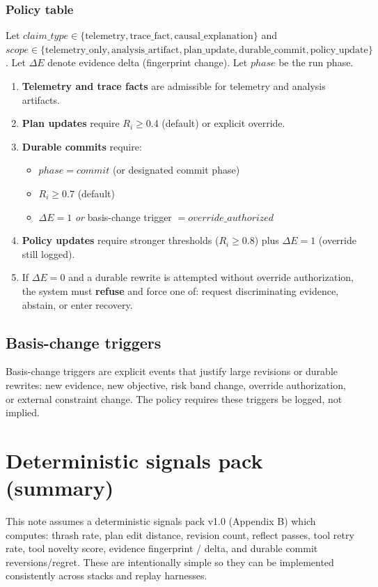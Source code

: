 \documentclass[11pt]{article}
\begin{document}
\subsubsection*{Policy table}
Let $claim\_type \in \{\text{telemetry}, \text{trace\_fact}, \text{causal\_explanation}\}$ and
$scope \in \{\text{telemetry\_only}, \text{analysis\_artifact}, \text{plan\_update}, \text{durable\_commit}, \text{policy\_update}\}$.
Let $\Delta E$ denote evidence delta (fingerprint change). Let $phase$ be the run phase.

\begin{enumerate}[leftmargin=2.0em]
  \item \textbf{Telemetry and trace facts} are admissible for telemetry and analysis artifacts.
  \item \textbf{Plan updates} require $R_i \ge 0.4$ (default) or explicit override.
  \item \textbf{Durable commits} require:
    \begin{itemize}
      \item $phase = commit$ (or designated commit phase)
      \item $R_i \ge 0.7$ (default)
      \item $\Delta E = 1$ \emph{or} basis-change trigger $= override\_authorized$
    \end{itemize}
  \item \textbf{Policy updates} require stronger thresholds ($R_i \ge 0.8$) plus $\Delta E = 1$ (override still logged).
  \item If $\Delta E = 0$ and a durable rewrite is attempted without override authorization, the system must
        \textbf{refuse} and force one of: request discriminating evidence, abstain, or enter recovery.
\end{enumerate}

\subsection{Basis-change triggers}
Basis-change triggers are explicit events that justify large revisions or durable rewrites:
new evidence, new objective, risk band change, override authorization, or external constraint change. The
policy requires these triggers be logged, not implied.

\section{Deterministic signals pack (summary)}
This note assumes a deterministic signals pack v1.0 (Appendix B) which computes:
thrash rate, plan edit distance, revision count, reflect passes, tool retry rate, tool novelty score, evidence
fingerprint / delta, and durable commit reversions/regret. These are intentionally simple so they can be
implemented consistently across stacks and replay harnesses.
\end{document}
